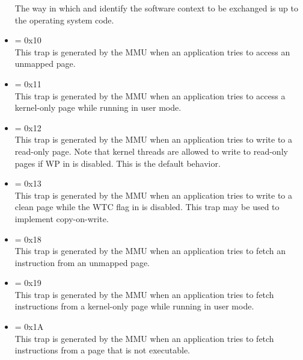 \begin{itemize}
The way in which  and  identify the software context to be
exchanged is up to the operating system code.

\setcounter{enumi}{15}
\item {} \label{trap:DMEM_PAGE_FAULT}  = 0x10
\\[6 pt]
This trap is generated by the MMU when an application tries to access an
unmapped page.

\setcounter{enumi}{16}
\item {} \label{trap:DMEM_KSPACE_VIO}  = 0x11
\\[6 pt]
This trap is generated by the MMU when an application tries to access a
kernel-only page while running in user mode.

\setcounter{enumi}{17}
\item {} \label{trap:DMEM_WRITE_VIO}  = 0x12
\\[6 pt]
This trap is generated by the MMU when an application tries to write to a
read-only page. Note that kernel threads are allowed to write to read-only
pages if WP in  is disabled. This is the default behavior.

\setcounter{enumi}{18}
\item {} \label{trap:DMEM_WRITE_TO_CLEAN}  = 0x13
\\[6 pt]
This trap is generated by the MMU when an application tries to write to a clean
page while the WTC flag in  is disabled. This trap may be used to
implement copy-on-write.

\setcounter{enumi}{23}
\item {} \label{trap:IMEM_PAGE_FAULT}  = 0x18
\\[6 pt]
This trap is generated by the MMU when an application tries to fetch an
instruction from an unmapped page.

\setcounter{enumi}{24}
\item {} \label{trap:IMEM_KSPACE_VIO}  = 0x19
\\[6 pt]
This trap is generated by the MMU when an application tries to fetch
instructions from a kernel-only page while running in user mode.

\setcounter{enumi}{25}
\item {} \label{trap:IMEM_ACCESS_VIO}  = 0x1A
\\[6 pt]
This trap is generated by the MMU when an application tries to fetch
instructions from a page that is not executable.


\end{itemize}
